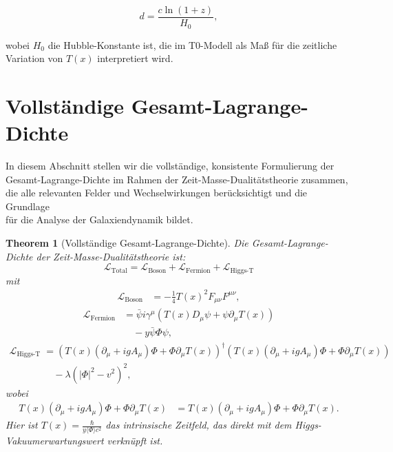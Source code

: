 \documentclass[a4paper,12pt]{article}
\newtheorem{theorem}{Theorem}
\newcommand{\Tfield}{T(x)}
\newcommand{\DhiggsTdef}{\Tfield (\partial_\mu + ig A_\mu) \Phi + \Phi \partial_\mu \Tfield}
\begin{document}
	\begin{equation}
		d = \frac{c \ln(1 + z)}{H_0},
	\end{equation}
	
	wobei \( H_0 \) die Hubble-Konstante ist, die im T0-Modell als Maß für die zeitliche Variation von \( \Tfield \) interpretiert wird.
	
	\section{Vollständige Gesamt-Lagrange-Dichte}
	
	In diesem Abschnitt stellen wir die vollständige, konsistente Formulierung der \\
	Gesamt-Lagrange-Dichte im Rahmen der Zeit-Masse-Dualitätstheorie zusammen, \\
	die alle relevanten Felder und Wechselwirkungen berücksichtigt und die Grundlage \\
	für die Analyse der Galaxiendynamik bildet.
	
	\begin{theorem}[Vollständige Gesamt-Lagrange-Dichte]
		Die Gesamt-Lagrange-Dichte der Zeit-Masse-Dualitätstheorie ist:
		\[
		\mathcal{L}_{\text{Total}} = \mathcal{L}_{\text{Boson}} + \mathcal{L}_{\text{Fermion}} + \mathcal{L}_{\text{Higgs-T}}
		\]
		mit
		\begin{align*}
			\mathcal{L}_{\text{Boson}} &= -\frac{1}{4} \Tfield^2 F_{\mu\nu} F^{\mu\nu},
		\end{align*}
		\begin{align*}
			\mathcal{L}_{\text{Fermion}} &= \bar{\psi} i \gamma^\mu \left( \Tfield D_\mu \psi + \psi \partial_\mu \Tfield \right) \\
			&\quad - y \bar{\psi} \Phi \psi,
		\end{align*}
		\begin{align*}
			\mathcal{L}_{\text{Higgs-T}} &= \left( \DhiggsTdef \right)^\dagger \left( \DhiggsTdef \right) \\
			&\quad - \lambda (|\Phi|^2 - v^2)^2,
		\end{align*}
		wobei
		\begin{align*}
			\DhiggsTdef &= \Tfield (\partial_\mu + ig A_\mu) \Phi + \Phi \partial_\mu \Tfield.
		\end{align*}
		Hier ist \( \Tfield = \frac{\hbar}{y \langle \Phi \rangle c^2} \) das intrinsische Zeitfeld, das direkt mit dem Higgs-Vakuumerwartungswert verknüpft ist.
	\end{theorem}
	
\end{document}
